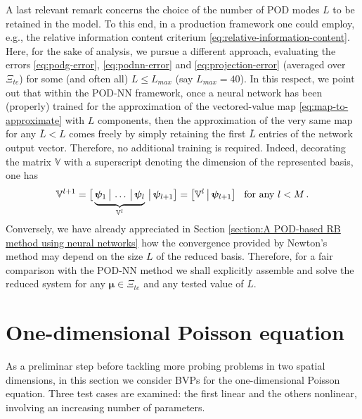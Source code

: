 \documentclass[12pt, a4paper, twoside, openright, notitlepage]{report}
\numberwithin{equation}{chapter}
\theoremstyle{theorem}
\theoremstyle{definition}
\theoremstyle{remark}
\theoremstyle{proposition}
\numberwithin{figure}{chapter}
\newcommand{\bg}[1]{\boldsymbol{#1}}
\begin{document}
		A last relevant remark concerns the choice of the number of POD modes $L$ to be retained in the model. To this end, in a production framework one could employ, e.g., the relative information content criterium \eqref{eq:relative-information-content}. Here, for the sake of analysis, we pursue a different approach, evaluating the errors \eqref{eq:podg-error}, \eqref{eq:podnn-error} and \eqref{eq:projection-error} (averaged over $\Xi_{te}$) for some (and often all) $L \leq L_{max}$ (say $L_{max} = 40$). In this respect, we point out that within the POD-NN framework, once a neural network has been (properly) trained for the approximation of the vectored-value map \eqref{eq:map-to-approximate} with $L$ components, then the approximation of the very same map for any $\bar{L} < L$ comes freely by simply retaining the first $\bar{L}$ entries of the network output vector. Therefore, no additional training is required. Indeed, decorating the matrix $\mathbb{V}$ with a superscript denoting the dimension of the represented basis, one has
		\begin{equation*}
			\mathbb{V}^{l+1} = \big[ \underbrace{\bg{\psi}_1 \, \big| \, \ldots \, \big| \, \bg{\psi}_l}_{\mathbb{V}^l} \, \big| \, \bg{\psi}_{l+1} \big] = \big[ \mathbb{V}^l \, \big| \, \bg{\psi}_{l+1} \big] \hspace*{0.3cm} \text{for any $l < M$} \, .
		\end{equation*}
		Conversely, we have already appreciated in Section \ref{section:A POD-based RB method using neural networks} how the convergence provided by Newton's method may depend on the size $L$ of the reduced basis. Therefore, for a fair comparison with the POD-NN method we shall explicitly assemble and solve the reduced system for any $\bg{\mu} \in \Xi_{te}$ and any tested value of $L$.
			
	\section{One-dimensional Poisson equation}
	\label{section:One-dimensional Poisson equation (results)}
	
		As a preliminar step before tackling more probing problems in two spatial dimensions, in this section we consider BVPs for the one-dimensional Poisson equation. Three test cases are examined: the first linear and the others nonlinear, involving an increasing number of parameters. 
		
	\vspace*{0.3cm}
	
\end{document}
